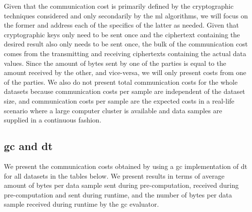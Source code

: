 Given that the communication cost is primarily defined by the cryptographic techniques considered and only secondarily by the \ac{ml} algorithms, we will focus on the former and address each of the specifics of the latter as needed. Given that cryptographic keys only need to be sent once and the ciphertext containing the desired result also only needs to be sent once, the bulk of the communication cost comes from the transmitting and receiving ciphertexts containing the actual data values. Since the amount of bytes sent by one of the parties is equal to the amount received by the other, and vice-versa, we will only present costs from one of the parties. We also do not present total communication costs for the whole datasets because communication costs per sample are independent of the dataset size, and communication costs per sample are the expected costs in a real-life scenario where a large computer cluster is available and data samples are supplied in a continuous fashion.


\subsection{\acl{gc} and \acl{dt}}

We present the communication costs obtained by using a \ac{gc} implementation of \ac{dt} for all datasets in the tables below. We present results in terms of average amount of bytes per data sample sent during pre-computation, received during pre-computation and sent during runtime, and the number of bytes per data sample received during runtime by the \ac{gc} evaluator.



